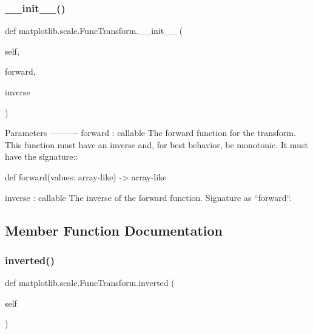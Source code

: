 \subsubsection{\texorpdfstring{\+\_\+\+\_\+init\+\_\+\+\_\+()}{\_\_init\_\_()}}
{\footnotesize\ttfamily def matplotlib.\+scale.\+Func\+Transform.\+\_\+\+\_\+init\+\_\+\+\_\+ (\begin{DoxyParamCaption}\item[{}]{self,  }\item[{}]{forward,  }\item[{}]{inverse }\end{DoxyParamCaption})}

\begin{DoxyVerb}Parameters
----------
forward : callable
    The forward function for the transform.  This function must have
    an inverse and, for best behavior, be monotonic.
    It must have the signature::

       def forward(values: array-like) -> array-like

inverse : callable
    The inverse of the forward function.  Signature as ``forward``.
\end{DoxyVerb}
 

\subsection{Member Function Documentation}
\mbox{\label{classmatplotlib_1_1scale_1_1FuncTransform_a84aff6aa144ebf8642a34243177b766f}} 
\subsubsection{\texorpdfstring{inverted()}{inverted()}}
{\footnotesize\ttfamily def matplotlib.\+scale.\+Func\+Transform.\+inverted (\begin{DoxyParamCaption}\item[{}]{self }\end{DoxyParamCaption})}

\mbox{\label{classmatplotlib_1_1scale_1_1FuncTransform_ae927de7ab1725cf98fa8e21df13c74b9}} 
